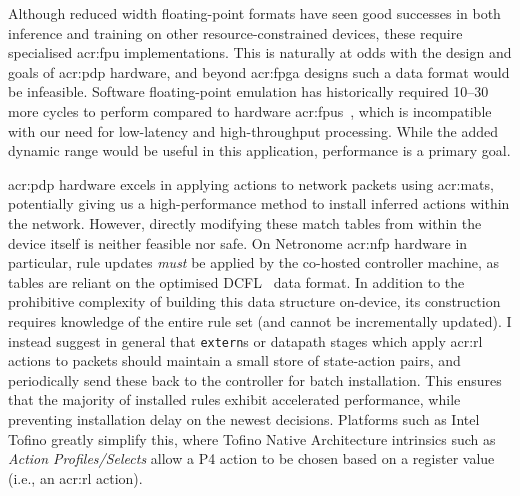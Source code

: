 Although reduced width floating-point formats have seen good successes in both inference and training on other resource-constrained devices, these require specialised \gls{acr:fpu} implementations.
This is naturally at odds with the design and goals of \gls{acr:pdp} hardware, and beyond \gls{acr:fpga} designs such a data format would be infeasible.
Software floating-point emulation has historically required \qtyrange{10}{30}{\times} more cycles to perform compared to hardware \glspl{acr:fpu}~\parencite{DBLP:conf/arith/IordacheT03}, which is incompatible with our need for low-latency and high-throughput processing.
While the added dynamic range would be useful in this application, performance is a primary goal.

\gls{acr:pdp} hardware excels in applying actions to network packets using \glspl{acr:mat}, potentially giving us a high-performance method to install inferred actions within the network.
However, directly modifying these match tables from within the device itself is neither feasible nor safe.
On Netronome \gls{acr:nfp} hardware in particular, rule updates \emph{must} be applied by the co-hosted controller machine, as tables are reliant on the optimised DCFL~\parencite{DBLP:conf/infocom/TaylorT05} data format.
In addition to the prohibitive complexity of building this data structure on-device, its construction requires knowledge of the entire rule set (and cannot be incrementally updated).
I instead suggest in general that \texttt{extern}s or datapath stages which apply \gls{acr:rl} actions to packets should maintain a small store of state-action pairs, and periodically send these back to the controller for batch installation.
This ensures that the majority of installed rules exhibit accelerated performance, while preventing installation delay on the newest decisions.
Platforms such as Intel Tofino greatly simplify this, where Tofino Native Architecture intrinsics such as \emph{Action Profiles/Selects} allow a P4 action to be chosen based on a register value (i.e., an \gls{acr:rl} action).

